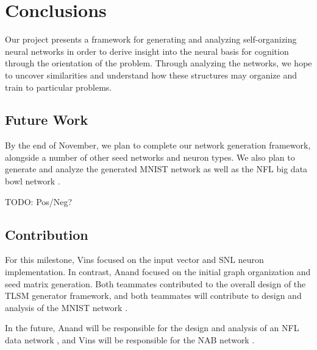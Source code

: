 \section{Conclusions} \label{sec:Conclusions}

Our project presents a framework for generating and analyzing self-organizing
neural networks in order to derive insight into the neural basis for cognition
through the orientation of the problem. Through analyzing the networks, we hope
to uncover similarities and understand how these structures may organize and
train to particular problems.

\subsection{Future Work}

By the end of November, we plan to complete our network generation framework,
alongside a number of other seed networks and neuron types. We also plan to
generate and analyze the generated MNIST network \cite{MNIST Dataset} as well
as the NFL big data bowl network \cite{NFL Dataset}.

TODO: Pos/Neg?

\subsection{Contribution}

For this milestone, Vins focused on the input vector and SNL neuron
implementation. In contrast, Anand focused on the initial graph organization and
seed matrix generation. Both teammates contributed to the overall design of the
TLSM generator framework, and both teammates will contribute to design and
analysis of the MNIST network \cite{MNIST Dataset}.

In the future, Anand will be responsible for the design and analysis of an NFL
data network \cite{NFL Dataset}, and Vins will be responsible for the NAB
network \cite{NAB Dataset}.